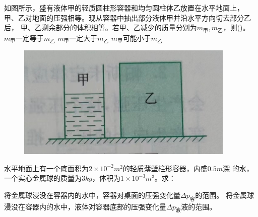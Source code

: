\documentclass[a4paper,cs4size]{BHCexam}
\begin{document}
\begin{groups}
\begin{questions}[]
        \question[5] 如图所示，盛有液体甲的轻质圆柱形容器和均匀圆柱体乙放置在水平地面上，
        甲、乙对地面的压强相等。现从容器中抽出部分液体甲并沿水平方向切去部分乙后，
        甲、乙剩余部分的体积相等。若甲、乙减少的质量分别为$m_{\text{甲}}, m_{\text{乙}}$，则(\quad\quad\quad)。
        {$m_{\text{甲}}$一定等于$m_{\text{乙}}$}
        {$m_{\text{甲}}$一定大于$m_{\text{乙}}$}
        {$m_{\text{甲}}$可能小于$m_{\text{乙}}$}
        \begin{figure}[htb]
            \flushright
            \includegraphics [scale=0.4,trim=0 0 0 0]{./image/physics_pressure_9.png}
            \label{fig:fig_pressure_9}
        \end{figure}
        \vspace{5cm}

        \question[5] 水平地面上有一个底面积为$2\times 10^{-2}m^2$的轻质薄壁柱形容器，内盛$0.5m$深
        的水，一个实心金属球的质量为$3kg$，体积为$1\times 10^{-3}m^3$。求：
        \begin{subquestions}
            \subquestion 将金属球浸没在容器内的水中，容器对桌面的压强变化量$\Delta p_{\text{容}}$的范围。
            \subquestion 将金属球浸没在容器内的水中，液体对容器底部的压强变化量$\Delta p_{\text{液}}$液的范围。
        \end{subquestions}


    \end{questions}





\end{groups}


\label{lastpage}
\end{document}
